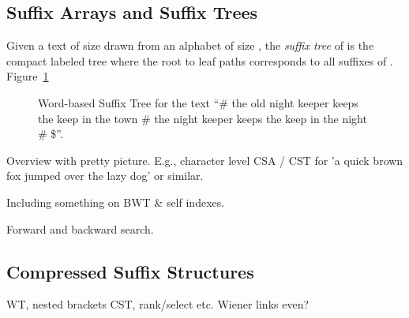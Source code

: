 
\subsection{Suffix Arrays and Suffix Trees}

Given a text {\col} of size {\collen} drawn from an alphabet {\alphabet} of
size {\alphabetsize}, the {\it suffix tree} of {\col} is the compact labeled
tree where the root to leaf paths corresponds to all suffixes of {\col}.
Figure~\ref{fig-suffix-tree}

\begin{figure}
\centering

\caption{Word-based Suffix Tree for the 
text ``\# the old night keeper keeps the keep in the town \# the night keeper keeps the keep in the night \# \$''.}
\label{fig-suffix-tree}
\end{figure}

Overview with pretty picture. E.g., character level CSA / CST for 
'a quick brown fox jumped over the lazy dog' or similar.

Including something on BWT \& self indexes.

Forward and backward search.

\subsection{Compressed Suffix Structures}

WT, nested brackets CST, rank/select etc. Wiener links even?
